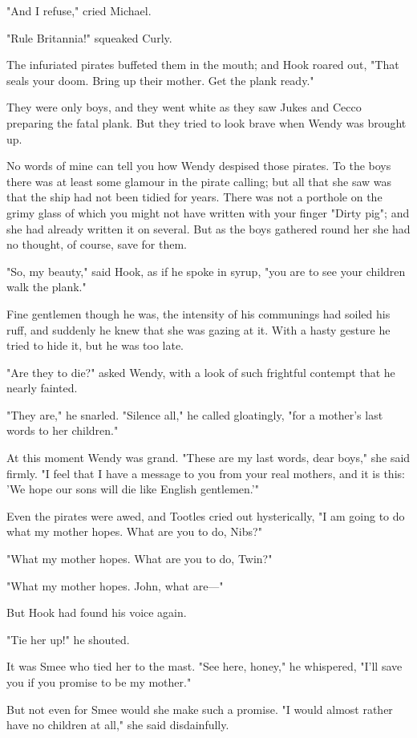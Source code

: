 "And I refuse," cried Michael.


"Rule Britannia!" squeaked Curly.


The infuriated pirates buffeted them in the mouth; and Hook roared out,
"That seals your doom. Bring up their mother. Get the plank ready."


They were only boys, and they went white as they saw Jukes and Cecco
preparing the fatal plank. But they tried to look brave when Wendy was
brought up.


No words of mine can tell you how Wendy despised those pirates. To the
boys there was at least some glamour in the pirate calling; but all that
she saw was that the ship had not been tidied for years. There was not a
porthole on the grimy glass of which you might not have written with your
finger "Dirty pig"; and she had already written it on several. But as the
boys gathered round her she had no thought, of course, save for them.


"So, my beauty," said Hook, as if he spoke in syrup, "you are to see your
children walk the plank."


Fine gentlemen though he was, the intensity of his communings had soiled
his ruff, and suddenly he knew that she was gazing at it. With a hasty
gesture he tried to hide it, but he was too late.


"Are they to die?" asked Wendy, with a look of such frightful contempt
that he nearly fainted.


"They are," he snarled. "Silence all," he called gloatingly, "for a
mother's last words to her children."


At this moment Wendy was grand. "These are my last words, dear boys," she
said firmly. "I feel that I have a message to you from your real mothers,
and it is this: 'We hope our sons will die like English gentlemen.'"


Even the pirates were awed, and Tootles cried out hysterically, "I am
going to do what my mother hopes. What are you to do, Nibs?"


"What my mother hopes. What are you to do, Twin?"


"What my mother hopes. John, what are—"


But Hook had found his voice again.


"Tie her up!" he shouted.


It was Smee who tied her to the mast. "See here, honey," he whispered,
"I'll save you if you promise to be my mother."


But not even for Smee would she make such a promise. "I would almost
rather have no children at all," she said disdainfully.


